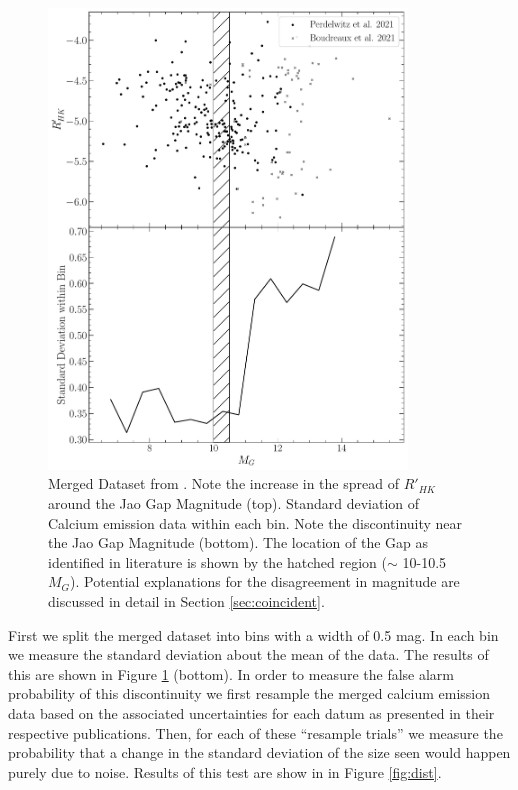 \begin{figure}
  \centering
  \includegraphics[width=0.85\textwidth]{figures/jaoMagActivity/CombinedDeviation.pdf}
  \caption{Merged Dataset from \citet{Perdelwitz2021, Boudreaux2022}. Note the
  increase in the spread of $R'_{HK}$ around the Jao Gap Magnitude (top).
  Standard deviation of Calcium emission data within each bin. Note the
  discontinuity near the Jao Gap Magnitude (bottom). The location of the Gap
  as identified in literature is shown by the hatched region ($\sim$ 10-10.5 $M_{G}$). Potential
  explanations for the disagreement in magnitude are discussed in detail
  in Section \ref{sec:coincident}.}
  \label{fig:initData}
\end{figure}

First we split the merged dataset into bins with a width of 0.5 mag. In each bin we
measure the standard deviation about the mean of the data. The results of this
are shown in Figure \ref{fig:initData} (bottom). In order to measure the false alarm
probability of this discontinuity we first resample the merged calcium
emission data based on the associated uncertainties for each datum as
presented in their respective publications. Then, for each of these ``resample
trials'' we measure the probability that a change in the standard deviation of
the size seen would happen purely due to noise. Results of this test are show in
in Figure \ref{fig:dist}. 

